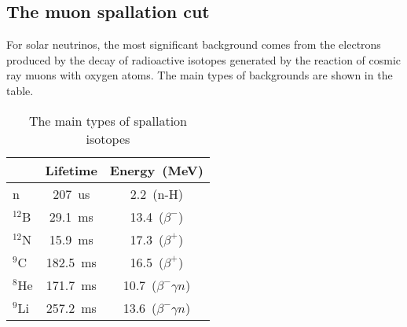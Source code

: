 \subsection{The muon spallation cut}
For solar neutrinos, the most significant background comes from the electrons produced by the decay of radioactive isotopes generated by the reaction of cosmic ray muons with oxygen atoms. The main types of backgrounds are shown in the table.
\begin{table}[htbp]
	\centering
	\caption{The main types of spallation isotopes}
	\label{tab:solar_spallation_bkg}
	\begin{tabular}{lcc}
		\toprule
		         & Lifetime       & Energy~(\si{MeV})          \\
		\midrule
		n        & \SI{207}{us}   & 2.2~(n-H)                  \\
		$^{12}$B & \SI{29.1}{ms}  & 13.4~($\beta^{-}$)         \\
		$^{12}$N & \SI{15.9}{ms}  & 17.3~($\beta^{+}$)         \\
		$^{9}$C  & \SI{182.5}{ms} & 16.5~($\beta^{+}$)         \\
		$^{8}$He & \SI{171.7}{ms} & 10.7~($\beta^{-}\gamma n$) \\
		$^{9}$Li & \SI{257.2}{ms} & 13.6~($\beta^{-}\gamma n$) \\
		\bottomrule
	\end{tabular}
\end{table}

